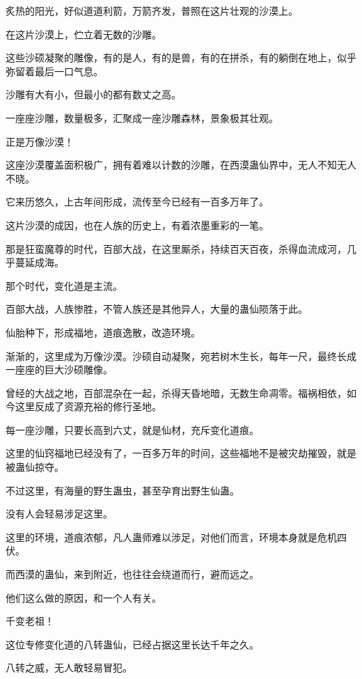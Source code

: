 
\begin{this_body}

炙热的阳光，好似道道利箭，万箭齐发，普照在这片壮观的沙漠上。

在这片沙漠上，伫立着无数的沙雕。

这些沙硕凝聚的雕像，有的是人，有的是兽，有的在拼杀，有的躺倒在地上，似乎弥留着最后一口气息。

沙雕有大有小，但最小的都有数丈之高。

一座座沙雕，数量极多，汇聚成一座沙雕森林，景象极其壮观。

正是万像沙漠！

这座沙漠覆盖面积极广，拥有着难以计数的沙雕，在西漠蛊仙界中，无人不知无人不晓。

它来历悠久，上古年间形成，流传至今已经有一百多万年了。

这片沙漠的成因，也在人族的历史上，有着浓墨重彩的一笔。

那是狂蛮魔尊的时代，百部大战，在这里厮杀，持续百天百夜，杀得血流成河，几乎蔓延成海。

那个时代，变化道是主流。

百部大战，人族惨胜，不管人族还是其他异人，大量的蛊仙陨落于此。

仙胎种下，形成福地，道痕逸散，改造环境。

渐渐的，这里成为万像沙漠。沙硕自动凝聚，宛若树木生长，每年一尺，最终长成一座座的巨大沙硕雕像。

曾经的大战之地，百部混杂在一起，杀得天昏地暗，无数生命凋零。福祸相依，如今这里反成了资源充裕的修行圣地。

每一座沙雕，只要长高到六丈，就是仙材，充斥变化道痕。

这里的仙窍福地已经没有了，一百多万年的时间，这些福地不是被灾劫摧毁，就是被蛊仙掠夺。

不过这里，有海量的野生蛊虫，甚至孕育出野生仙蛊。

没有人会轻易涉足这里。

这里的环境，道痕浓郁，凡人蛊师难以涉足，对他们而言，环境本身就是危机四伏。

而西漠的蛊仙，来到附近，也往往会绕道而行，避而远之。

他们这么做的原因，和一个人有关。

千变老祖！

这位专修变化道的八转蛊仙，已经占据这里长达千年之久。

八转之威，无人敢轻易冒犯。


\end{this_body}
